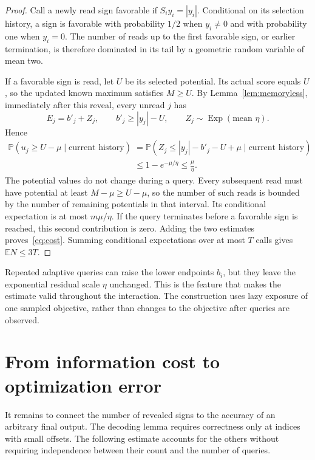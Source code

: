 \documentclass[11pt,a4paper]{article}
\theoremstyle{definition}
\theoremstyle{remark}
\newcommand{\E}{\mathbb E}
\newcommand{\Prb}{\mathbb P}
\DeclareMathOperator{\Exp}{Exp}
\begin{document}
\begin{proof}
Call a newly read sign favorable if $S_i y_i=|y_i|$.
Conditional on its selection history, a sign is favorable with probability
$1/2$ when $y_i\ne0$ and with probability one when $y_i=0$.
The number of reads up to the first favorable sign, or earlier termination,
is therefore dominated in its tail by a geometric random variable of mean
two.

If a favorable sign is read, let $U$ be its selected potential. Its actual
score equals $U$, so the updated known maximum satisfies $M\ge U$.
By Lemma~\ref{lem:memoryless}, immediately after this reveal, every unread
$j$ has
\[
 E_j=b'_j+Z_j,\qquad b'_j\ge|y_j|-U,
 \qquad Z_j\sim\Exp(\text{mean }\eta).
\]
Hence
\begin{align*}
 \Prb(u_j\ge U-\mu\mid\text{current history})
 &=\Prb(Z_j\le |y_j|-b'_j-U+\mu\mid\text{current history})\\
 &\le1-e^{-\mu/\eta}\le\frac\mu\eta.
\end{align*}
The potential values do not change during a query. Every subsequent read
must have potential at least $M-\mu\ge U-\mu$, so the number of such reads
is bounded by the number of remaining potentials in that interval. Its
conditional expectation is at most $m\mu/\eta$.
If the query terminates before a favorable sign is reached, this second
contribution is zero. Adding the two estimates proves~\eqref{eq:cost}.
Summing conditional expectations over at most $T$ calls gives $\E N\le3T$.
\end{proof}

Repeated adaptive queries can raise the lower endpoints $b_i$, but they leave
the exponential residual scale $\eta$ unchanged. This is the feature that
makes the estimate valid throughout the interaction. The construction uses
lazy exposure of one sampled objective, rather than changes to the objective
after queries are observed.

\section{From information cost to optimization error}\label{sec:reduction}

It remains to connect the number of revealed signs to the accuracy of an
arbitrary final output. The decoding lemma requires correctness only at
indices with small offsets. The following estimate accounts for the others
without requiring independence between their count and the number of queries.
\end{document}
